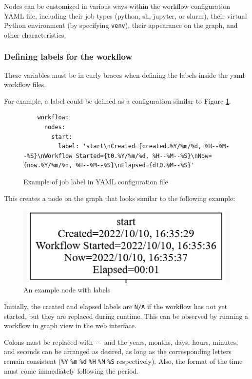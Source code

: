 Nodes can be customized in various ways within the workflow
configuration YAML file, including their job types (python, sh, jupyter,
or slurm), their virtual Python environment (by specifying
\texttt{venv}), their appearance on the graph, and other
characteristics.

\subsubsection{Defining labels for the
workflow}\label{defining-labels-for-the-workflow}

These variables must be in curly braces when defining the labels inside
the yaml workflow files.

For example, a label could be defined as a configuration similar 
to Figure \ref{fig:label-job}.

\begin{figure}
\smallskip
    \begin{verbatim}
    workflow:
      nodes:
        start:
          label: 'start\nCreated={created.%Y/%m/%d, %H--%M--%S}\nWorkflow Started={t0.%Y/%m/%d, %H--%M--%S}\nNow={now.%Y/%m/%d, %H--%M--%S}\nElapsed={dt0.%M--%S}'
    \end{verbatim}
    \caption{Example of job label in YAML configuration file}
    \label{fig:label-job}
\end{figure}

This creates a node on the graph that looks similar to the following
example:

\begin{figure}
\centering
\includegraphics[width=0.7\columnwidth]{images/labelmaker-example.png}
\caption{An example node with labels}
\end{figure}

Initially, the created and elapsed labels are \texttt{N/A} if the
workflow has not yet started, but they are replaced during runtime. This
can be observed by running a workflow in graph view in the web
interface.

Colons must be replaced with \texttt{-\/-} and the years, months, days,
hours, minutes, and seconds can be arranged as desired, as long as the
corresponding letters remain consistent (\texttt{\%Y} \texttt{\%m}
\texttt{\%d} \texttt{\%H} \texttt{\%M} \texttt{\%S} respectively). Also,
the format of the time must come immediately following the period.


